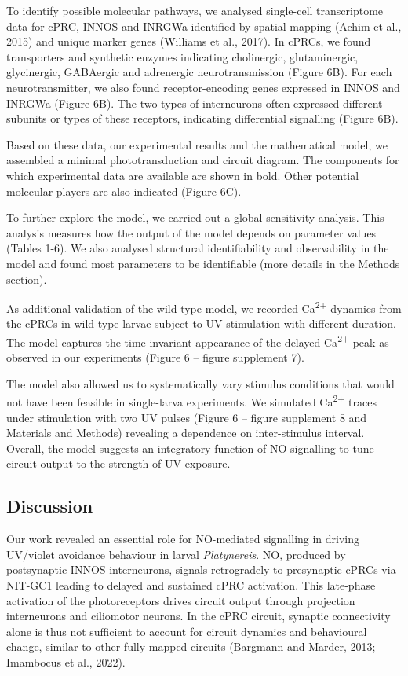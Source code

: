 \documentclass[
  11pt,
  letterpaper,
  DIV=11,
  numbers=noendperiod]{scrartcl}
\begin{document}
To identify possible molecular pathways, we analysed single-cell
transcriptome data for cPRC, INNOS and INRGWa identified by spatial
mapping (Achim et al., 2015) and unique marker genes (Williams et al.,
2017). In cPRCs, we found transporters and synthetic enzymes indicating
cholinergic, glutaminergic, glycinergic, GABAergic and adrenergic
neurotransmission (Figure 6B). For each neurotransmitter, we also found
receptor-encoding genes expressed in INNOS and INRGWa (Figure 6B). The
two types of interneurons often expressed different subunits or types of
these receptors, indicating differential signalling (Figure 6B).

Based on these data, our experimental results and the mathematical
model, we assembled a minimal phototransduction and circuit diagram. The
components for which experimental data are available are shown in bold.
Other potential molecular players are also indicated (Figure 6C).

To further explore the model, we carried out a global sensitivity
analysis. This analysis measures how the output of the model depends on
parameter values (Tables 1-6). We also analysed structural
identifiability and observability in the model and found most parameters
to be identifiable (more details in the Methods section).

As additional validation of the wild-type model, we recorded
Ca\textsuperscript{2+}-dynamics from the cPRCs in wild-type larvae
subject to UV stimulation with different duration. The model captures
the time-invariant appearance of the delayed Ca\textsuperscript{2+} peak
as observed in our experiments (Figure 6 -- figure supplement 7).

The model also allowed us to systematically vary stimulus conditions
that would not have been feasible in single-larva experiments. We
simulated Ca\textsuperscript{2+} traces under stimulation with two UV
pulses (Figure 6 -- figure supplement 8 and Materials and Methods)
revealing a dependence on inter-stimulus interval. Overall, the model
suggests an integratory function of NO signalling to tune circuit output
to the strength of UV exposure.

\subsection{Discussion}\label{discussion}

Our work revealed an essential role for NO-mediated signalling in
driving UV/violet avoidance behaviour in larval \emph{Platynereis}. NO,
produced by postsynaptic INNOS interneurons, signals retrogradely to
presynaptic cPRCs via NIT-GC1 leading to delayed and sustained cPRC
activation. This late-phase activation of the photoreceptors drives
circuit output through projection interneurons and ciliomotor neurons.
In the cPRC circuit, synaptic connectivity alone is thus not sufficient
to account for circuit dynamics and behavioural change, similar to other
fully mapped circuits (Bargmann and Marder, 2013; Imambocus et al.,
2022).
\end{document}

